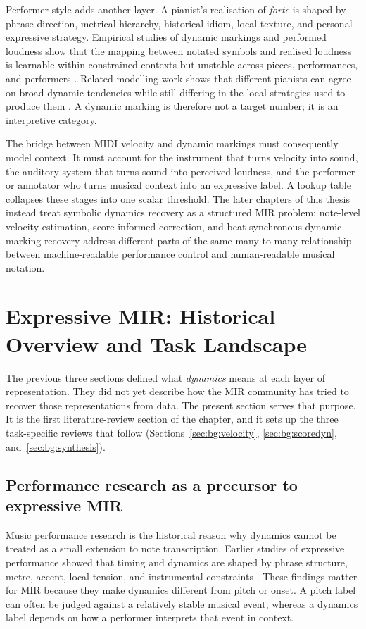Performer style adds another layer. A pianist's realisation of \textit{forte} is shaped by phrase direction, metrical hierarchy, historical idiom, local texture, and personal expressive strategy. Empirical studies of dynamic markings and performed loudness show that the mapping between notated symbols and realised loudness is learnable within constrained contexts but unstable across pieces, performances, and performers \cite{kosta2016mapping}. Related modelling work shows that different pianists can agree on broad dynamic tendencies while still differing in the local strategies used to produce them \cite{jones2023probingdyn}. A dynamic marking is therefore not a target number; it is an interpretive category.

The bridge between MIDI velocity and dynamic markings must consequently model context. It must account for the instrument that turns velocity into sound, the auditory system that turns sound into perceived loudness, and the performer or annotator who turns musical context into an expressive label. A lookup table collapses these stages into one scalar threshold. The later chapters of this thesis instead treat symbolic dynamics recovery as a structured MIR problem: note-level velocity estimation, score-informed correction, and beat-synchronous dynamic-marking recovery address different parts of the same many-to-many relationship between machine-readable performance control and human-readable musical notation.

\section{Expressive MIR: Historical Overview and Task Landscape}
\label{sec:bg:expressive_mir}

The previous three sections defined what \emph{dynamics} means at each layer of representation. They did not yet describe how the MIR community has tried to recover those representations from data. The present section serves that purpose. It is the first literature-review section of the chapter, and it sets up the three task-specific reviews that follow (Sections~\ref{sec:bg:velocity}, \ref{sec:bg:scoredyn}, and~\ref{sec:bg:synthesis}).

\subsection{Performance research as a precursor to expressive MIR}

Music performance research is the historical reason why dynamics cannot be treated as a small extension to note transcription. Earlier studies of expressive performance showed that timing and dynamics are shaped by phrase structure, metre, accent, local tension, and instrumental constraints \cite{goebl2003role,cancinoChacon2018computational}. These findings matter for MIR because they make dynamics different from pitch or onset. A pitch label can often be judged against a relatively stable musical event, whereas a dynamics label depends on how a performer interprets that event in context.

